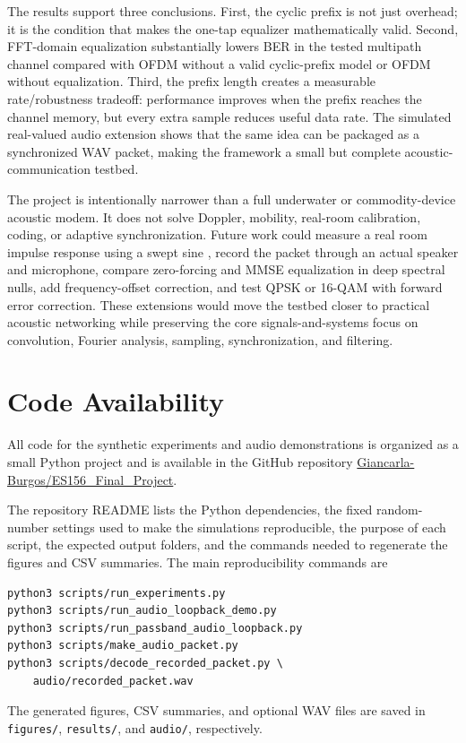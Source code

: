 \documentclass[conference]{IEEEtran}
\begin{document}
The results support three conclusions. First, the cyclic prefix is not just overhead; it is the condition that makes the one-tap equalizer mathematically valid. Second, FFT-domain equalization substantially lowers BER in the tested multipath channel compared with OFDM without a valid cyclic-prefix model or OFDM without equalization. Third, the prefix length creates a measurable rate/robustness tradeoff: performance improves when the prefix reaches the channel memory, but every extra sample reduces useful data rate. The simulated real-valued audio extension shows that the same idea can be packaged as a synchronized WAV packet, making the framework a small but complete acoustic-communication testbed.

The project is intentionally narrower than a full underwater or commodity-device acoustic modem. It does not solve Doppler, mobility, real-room calibration, coding, or adaptive synchronization. Future work could measure a real room impulse response using a swept sine \cite{farina2000}, record the packet through an actual speaker and microphone, compare zero-forcing and MMSE equalization in deep spectral nulls, add frequency-offset correction, and test QPSK or 16-QAM with forward error correction. These extensions would move the testbed closer to practical acoustic networking while preserving the core signals-and-systems focus on convolution, Fourier analysis, sampling, synchronization, and filtering.

\section*{Code Availability}
All code for the synthetic experiments and audio demonstrations is organized as a small Python project and is available in the GitHub repository
\href{https://github.com/Giancarla-Burgos/ES156_Final_Project}{Giancarla-Burgos/ES156\_Final\_Project}.

The repository README lists the Python dependencies, the fixed random-number settings used to make the simulations reproducible, the purpose of each script, the expected output folders, and the commands needed to regenerate the figures and CSV summaries. The main reproducibility commands are

\begingroup\scriptsize\begin{verbatim}
python3 scripts/run_experiments.py
python3 scripts/run_audio_loopback_demo.py
python3 scripts/run_passband_audio_loopback.py
python3 scripts/make_audio_packet.py
python3 scripts/decode_recorded_packet.py \
    audio/recorded_packet.wav
\end{verbatim}\endgroup
The generated figures, CSV summaries, and optional WAV files are saved in \texttt{figures/}, \texttt{results/}, and \texttt{audio/}, respectively.
\end{document}
